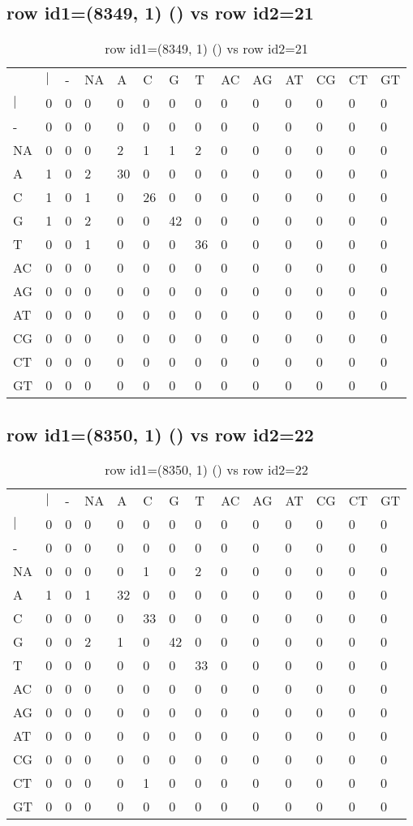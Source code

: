 \subsection{row id1=(8349, 1) () vs row id2=21}
\begin{center}
\begin{longtable}{|l|l|l|l|l|l|l|l|l|l|l|l|l|l|}
\caption{row id1=(8349, 1) () vs row id2=21} \label{table_dm558}\\
\hline
\\
\hline
&$|$&-&NA&A&C&G&T&AC&AG&AT&CG&CT&GT\\
$|$&0&0&0&0&0&0&0&0&0&0&0&0&0\\
-&0&0&0&0&0&0&0&0&0&0&0&0&0\\
NA&0&0&0&2&1&1&2&0&0&0&0&0&0\\
A&1&0&2&30&0&0&0&0&0&0&0&0&0\\
C&1&0&1&0&26&0&0&0&0&0&0&0&0\\
G&1&0&2&0&0&42&0&0&0&0&0&0&0\\
T&0&0&1&0&0&0&36&0&0&0&0&0&0\\
AC&0&0&0&0&0&0&0&0&0&0&0&0&0\\
AG&0&0&0&0&0&0&0&0&0&0&0&0&0\\
AT&0&0&0&0&0&0&0&0&0&0&0&0&0\\
CG&0&0&0&0&0&0&0&0&0&0&0&0&0\\
CT&0&0&0&0&0&0&0&0&0&0&0&0&0\\
GT&0&0&0&0&0&0&0&0&0&0&0&0&0\\
\hline
\end{longtable}
\end{center}

\subsection{row id1=(8350, 1) () vs row id2=22}
\begin{center}
\begin{longtable}{|l|l|l|l|l|l|l|l|l|l|l|l|l|l|}
\caption{row id1=(8350, 1) () vs row id2=22} \label{table_dm560}\\
\hline
\\
\hline
&$|$&-&NA&A&C&G&T&AC&AG&AT&CG&CT&GT\\
$|$&0&0&0&0&0&0&0&0&0&0&0&0&0\\
-&0&0&0&0&0&0&0&0&0&0&0&0&0\\
NA&0&0&0&0&1&0&2&0&0&0&0&0&0\\
A&1&0&1&32&0&0&0&0&0&0&0&0&0\\
C&0&0&0&0&33&0&0&0&0&0&0&0&0\\
G&0&0&2&1&0&42&0&0&0&0&0&0&0\\
T&0&0&0&0&0&0&33&0&0&0&0&0&0\\
AC&0&0&0&0&0&0&0&0&0&0&0&0&0\\
AG&0&0&0&0&0&0&0&0&0&0&0&0&0\\
AT&0&0&0&0&0&0&0&0&0&0&0&0&0\\
CG&0&0&0&0&0&0&0&0&0&0&0&0&0\\
CT&0&0&0&0&1&0&0&0&0&0&0&0&0\\
GT&0&0&0&0&0&0&0&0&0&0&0&0&0\\
\hline
\end{longtable}
\end{center}

